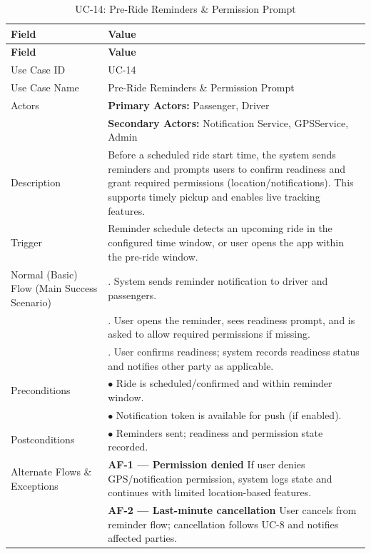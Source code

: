 \begin{longtable}{|>{\raggedright\arraybackslash}p{4cm}|>{\raggedright\arraybackslash}p{11cm}|}
\caption{UC-14: Pre-Ride Reminders \& Permission Prompt}
\label{tab:uc-14} \\
\hline
\rowcolor{lightgray!30}
\textbf{Field} & \textbf{Value} \\
\hline
\endfirsthead
\hline
\rowcolor{lightgray!30}
\textbf{Field} & \textbf{Value} \\
\hline
\endhead
\hline
\endfoot
\hline
\endlastfoot
Use Case ID & UC-14 \\
\hline
Use Case Name & Pre-Ride Reminders \& Permission Prompt \\
\hline
Actors & \textbf{Primary Actors:} Passenger, Driver \\
& \textbf{Secondary Actors:} Notification Service, GPSService, Admin \\
\hline
Description & Before a scheduled ride start time, the system sends reminders and prompts users to confirm readiness and grant required permissions (location/notifications). This supports timely pickup and enables live tracking features. \\
\hline
Trigger & Reminder schedule detects an upcoming ride in the configured time window, or user opens the app within the pre-ride window. \\
\hline
Normal (Basic) Flow (Main Success Scenario) & 1. System sends reminder notification to driver and passengers. \\
& 2. User opens the reminder, sees readiness prompt, and is asked to allow required permissions if missing. \\
& 3. User confirms readiness; system records readiness status and notifies other party as applicable. \\
\hline
Preconditions & $\bullet$ Ride is scheduled/confirmed and within reminder window. \\
& $\bullet$ Notification token is available for push (if enabled). \\
\hline
Postconditions & $\bullet$ Reminders sent; readiness and permission state recorded. \\
\hline
Alternate Flows \& Exceptions & \textbf{AF-1 — Permission denied} \newline If user denies GPS/notification permission, system logs state and continues with limited location-based features. \\
& \textbf{AF-2 — Last-minute cancellation} \newline User cancels from reminder flow; cancellation follows UC-8 and notifies affected parties. \\

\end{longtable}
